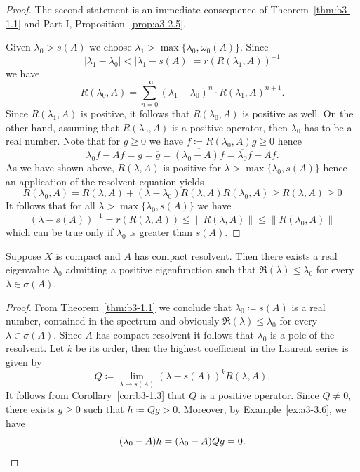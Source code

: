 \begin{proof}
	The second statement is an immediate consequence of Theorem~\ref{thm:b3-1.1} and Part-I, Proposition~\ref{prop:a3-2.5}.
	
	Given $\lambda_0 > s(A)$ we choose $\lambda_1 > \max\{\lambda_0,\omega_{0}(A)\}$.
	Since 
	\[
	\text{$|\lambda_1 - \lambda_0| < |\lambda_1 - s(A)| = r(R(\lambda_1,A))^{-1}$}
	\]
	we have
	\begin{equation}\label{eq:b3-1.10}
		R(\lambda_0,A) = \sum_{n=0}^{\infty} (\lambda_1 - \lambda_0)^n \cdot R(\lambda_1,A)^{n+1}.
	\end{equation}
	Since $R(\lambda_1,A)$ is positive, it follows that $R(\lambda_0,A)$ is positive as well.
	On the other hand, assuming that $R(\lambda_0,A)$ is a positive operator, then $\lambda_0$ has to be a real number.
	Note that for $g \geq 0$ we have $f \coloneq R(\lambda_0,A)g \geq 0$ hence 
\[
	\lambda_0f - Af = g = \overline{g} = \overline{(\lambda_0 - A)f} = \overline{\lambda_0}f - Af .
\]
%
As we have shown above, $R(\lambda,A)$ is positive for $\lambda > \max\{\lambda_0,s(A)\}$ hence an application of the resolvent equation yields
	\begin{equation}\label{eq:b3-1.11}
		R(\lambda_0,A) = R(\lambda,A) + (\lambda - \lambda_0)R(\lambda,A)R(\lambda_0,A) \geq R(\lambda,A) \geq 0
	\end{equation}
	It follows that for all $\lambda > \max\{\lambda_{0},s(A)\}$ we have
	\begin{equation}\label{eq:b3-1.12}
		(\lambda - s(A))^{-1} = r(R(\lambda,A)) \leq \|R(\lambda,A)\| \leq \|R(\lambda_{0},A)\|
	\end{equation}
	which can be true only if\/ $\lambda_{0}$ is greater than $s(A)$.
\end{proof}
\begin{corollary}\label{cor:b3-1.4}
Suppose $X$ is compact and $A$ has compact resolvent.	
	Then there exists a real eigenvalue $\lambda_{0}$ admitting a positive eigenfunction such that 
	$\Re(\lambda) \leq \lambda_{0}$ for every $\lambda \in \sigma(A)$.
\end{corollary}
\begin{proof}
	From Theorem~\ref{thm:b3-1.1} we conclude that $\lambda_{0} \coloneq s(A)$ is a real number, contained in the spectrum and obviously $\Re(\lambda) \leq \lambda_{0}$ for every $\lambda \in \sigma(A)$.
	Since $A$ has compact resolvent it follows that $\lambda_{0}$ is a pole of the resolvent.
	Let $k$ be its order, then the highest coefficient in the Laurent series is given by
	\begin{equation}\label{eq:b3-1.13}
		Q \coloneq \lim_{\lambda \to s(A)} (\lambda - s(A))^{k}R(\lambda,A) .
	\end{equation}
It follows from Corollary~\ref{cor:b3-1.3} that $Q$ is a positive operator.
Since $Q \neq 0$, there exists $g \geq 0$ such that $h \coloneq Qg > 0$.
Moreover, by Example~\ref{ex:a3-3.6}, we have 
%
\begin{equation*}
	 (\lambda_{0} - A)h = (\lambda_{0} - A)Qg = 0 .
     \qedhere
\end{equation*}
%
\end{proof}
